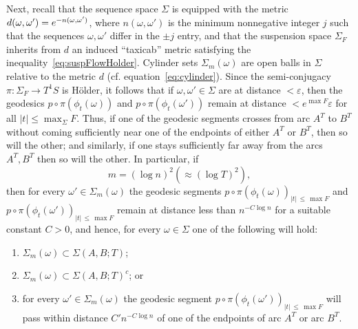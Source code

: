 \documentclass[10pt]{amsart}
\theoremstyle{definition}\newtheorem{defi}[theo]{Definition}\newtheorem{rema}[theo]{Remark}\newtheorem{exam}[theo]{Example}\newtheorem{exem}[theo]{Example}\newtheorem{nota}[theo]{Notation}
\newcommand*{\romanenumi}{\renewcommand*{\theenumi}{\roman{enumi}}}
\begin{document}
Next, recall that the sequence space $\Sigma$ is equipped with the metric $d(\omega,\omega') \linebreak= e^{-n(\omega,\omega')}$, where $n(\omega,\omega')$ is the minimum nonnegative integer $j$ such that the sequences $\omega,\omega'$ differ in the $\pm j$ entry, and that the suspension space $\Sigma_{F}$ inherits from $d$ an induced ``taxicab'' metric satisfying the inequality~\eqref{eq:suspFlowHolder}. Cylinder sets $\Sigma_{m}(\omega)$ are open balls in $\Sigma$ relative to the metric $d$ (cf. equation~\eqref{eq:cylinder}). Since the semi-conjugacy $\pi: \Sigma_{F}\rightarrow T^{1}S$ is H\"older, it follows that if $\omega, \omega' \in \Sigma$ are at distance $<\varepsilon$, then the geodesics $p\circ\pi(\phi_{t}(\omega))$ and $p\circ\pi (\phi_{t}(\omega'))$ remain at distance $< e^{\max F}\varepsilon$ for all $|t|\leq \max_{\Sigma}F$. Thus, if one of the geodesic segments crosses from arc $A^{T}$ to $B^{T}$ without coming sufficiently near one of the endpoints of either $A^{T}$ or $B^{T}$, then so will the other; and similarly, if one stays sufficiently far away from the arcs $A^{T},B^{T}$ then so will the other. In particular, if
\begin{equation}\label{eq:m:n}
m= (\log n)^{2} (\approx (\log T)^{2}),
\end{equation}
then for every $\omega' \in \Sigma_{m}(\omega)$ the geodesic segments $p\circ\pi (\phi_{t}(\omega))_{|t|\,\leq \,\max F}$ and $p\circ\pi (\phi_{t}(\omega'))_{|t|\,\leq\, \max F}$ remain at distance less than $n^{-C \log n}$ for a suitable constant $C>0$, and hence, for every $\omega \in \Sigma$ one of the following will hold:
\begin{enumerate}\romanenumi
\item \label{listproof7.1.1}$\Sigma_{m}(\omega) \subset \Sigma(A,B;T)$;
\item \label{listproof7.1.2}$\Sigma_{m}(\omega)\subset \Sigma(A,B;T)^{c}$; or
\item \label{listproof7.1.3}for every $\omega' \in\Sigma_{m}(\omega)$ the geodesic segment $p\circ\pi (\phi_{t}(\omega'))_{|t|\,\leq\,\max F}$ will pass within distance $C' n^{-C \log n}$ of one of the endpoints of arc $A^{T}$ or arc $B^{T}$.
\end{enumerate}
\end{document}
